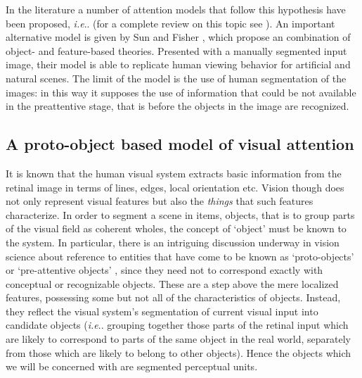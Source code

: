 \documentclass{llncs}
\makeatletter
\DeclareRobustCommand\onedot{\futurelet\@let@token\@onedot}
\def\@onedot{\ifx\@let@token.\else.\null\fi\xspace}
\def\ie{\emph{i.e}\onedot} \def\Ie{\emph{I.e}\onedot}
\makeatother
\begin{document}
In the literature a number of attention models that
follow this hypothesis have been proposed, \ie \cite{MilaneseGP95,IttiKN98}
(for a complete review on this topic see \cite{IttiK01}).
An important alternative model is
given by Sun and Fisher \cite{SunF03}, which propose an
combination of object- and feature-based theories. Presented
with a manually segmented input image, their model is able to
replicate human viewing behavior for artificial and natural
scenes. The limit of the model is the use of human segmentation of the images:
in this way it supposes the use of information that could
be not available in the preattentive stage, that is before
the objects in the image are recognized.


\subsection{A proto-object based model of visual attention}

It is known that the human visual
system extracts basic information from the retinal
image in terms of lines, edges, local orientation etc.
Vision though does not only represent visual features
but also the \emph{things} that such features characterize. In
order to segment a scene in items, objects, that is to
group parts of the visual field as coherent wholes, the
concept of `object' must be known to the system.
In particular, there is an intriguing discussion underway
in vision science about reference to entities that have
come to be known as `proto-objects' or `pre-attentive
objects' \cite{RensinkORC97,Rensink00a,Pylyshyn01}, since they need not to correspond
exactly with conceptual or recognizable objects.
These are a step above the mere localized
features, possessing some but not all of the
characteristics of objects.
Instead, they reflect the visual
system's segmentation of current visual input into candidate objects (\ie grouping
together those parts of the retinal input which are likely to correspond to parts of the
same object in the real world, separately from those which are likely to belong to
other objects).
Hence the objects which we will be concerned with are segmented perceptual units.
\end{document}
